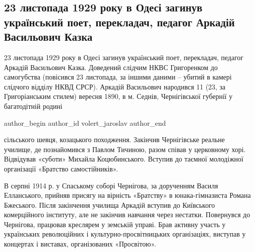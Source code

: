  
 
 
 

 

\subsection{23 листопада 1929 року в Одесі загинув український поет, перекладач, педагог Аркадій Васильович Казка}


23 листопада 1929 року в Одесі загинув український поет, перекладач, педагог
Аркадій Васильович Казка.  Доведений слідчим НКВС Григоренком до самогубства
(повісився 23 листопада, за іншими даними – убитий в камері слідчого відділу
НКВД СРСР).  Аркадій Васильович народився  11 (23, за Григоріанським стилем)
вересня 1890, в м. Седнів, Чернігівської губернії у багатодітній родині

\ifcmt
  author_begin
   author_id volert_jaroslav
  author_end
\fi

сільського шевця, козацького походження. Закінчив Чернігівське реальне училище,
де познайомився з Павлом Тичиною, разом співав у церковному хорі. Відвідував
«суботи» Михайла Коцюбинського. Вступив до таємної молодіжної організації
«Братство самостійників». 

В серпні 1914 р. у Спаському соборі Чернігова, за дорученням Василя
Елланського, прийняв присягу на вірність «Братству»  в юнака-гімназиста Романа
Бжеського. Після закінчення училища Аркадій вступив до Київського комерційного
інституту, але не закінчив навчання через нестатки.  Повернувся до Чернігова,
працював креслярем у земській управі. Брав активну участь у українських
революційних і культурно-просвітницьких організаціях, виступав у концертах і
виставах, організованих «Просвітою». 

